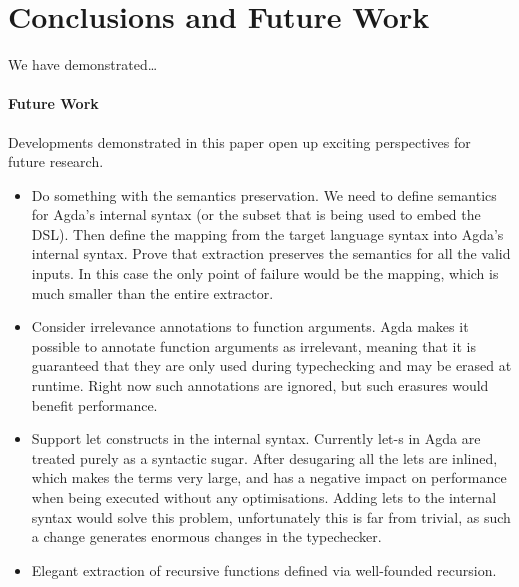 \section{Conclusions and Future Work}
We have demonstrated\dots

\paragraph{Future Work}
Developments demonstrated in this paper open up exciting perspectives
for future research.
\begin{itemize}
  \item Do something with the semantics preservation.  We need to
    define semantics for Agda's internal syntax (or the subset
    that is being used to embed the DSL).  Then define the mapping
    from the target language syntax into Agda's internal syntax.
    Prove that extraction preserves the semantics for all the valid
    inputs.  In this case the only point of failure would be the
    mapping, which is much smaller than the entire extractor.
  \item Consider irrelevance annotations to function arguments.
    Agda makes it possible to annotate function arguments as irrelevant,
    meaning that it is guaranteed that they are only used during
    typechecking and may be erased at runtime.  Right now such annotations
    are ignored, but such erasures would benefit performance.
  \item Support let constructs in the internal syntax.  Currently
    let-s in Agda are treated purely as a syntactic sugar.  After
    desugaring all the lets are inlined, which makes the terms
    very large, and has a negative impact on performance when
    being executed without any optimisations.  Adding lets to the
    internal syntax would solve this problem, unfortunately this is
    far from trivial, as such a change generates enormous changes
    in the typechecker.
  \item Elegant extraction of recursive functions defined via
    well-founded recursion.
\end{itemize}

